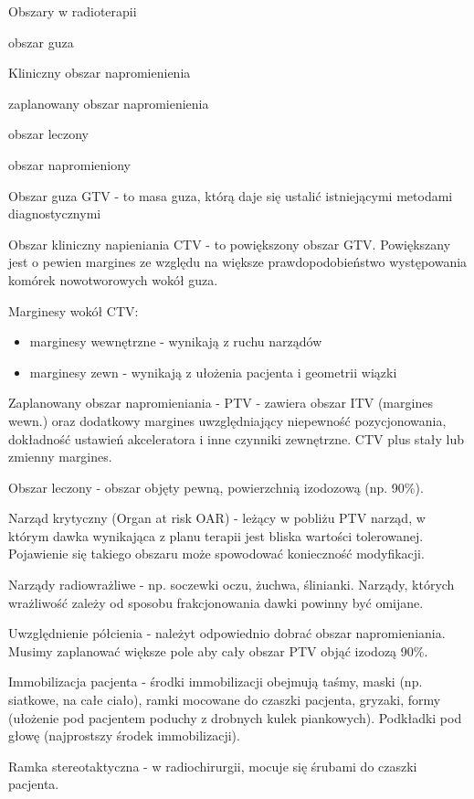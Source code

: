 \documentclass{article}
\begin{document}
Obszary w radioterapii

obszar guza

Kliniczny obszar napromienienia

zaplanowany obszar napromienienia

obszar leczony

obszar napromieniony

Obszar guza GTV - to masa guza, którą daje się ustalić istniejącymi metodami diagnostycznymi

Obszar kliniczny napieniania CTV - to powiększony obszar GTV. Powiększany jest o pewien margines ze względu na większe prawdopodobieństwo występowania komórek nowotworowych wokół guza.

Marginesy wokół CTV:

\begin{itemize}
    \item marginesy wewnętrzne - wynikają z ruchu narządów
    \item marginesy zewn - wynikają z ułożenia pacjenta i geometrii wiązki
\end{itemize}

Zaplanowany obszar napromieniania - PTV - zawiera obszar ITV (margines wewn.) oraz dodatkowy margines uwzględniający niepewność pozycjonowania, dokładność ustawień akceleratora i inne czynniki zewnętrzne. CTV plus stały lub zmienny margines.

Obszar leczony - obszar objęty pewną, powierzchnią izodozową (np. 90\%).

Narząd krytyczny (Organ at risk OAR) - leżący w pobliżu PTV narząd, w którym dawka wynikająca z planu terapii jest bliska wartości tolerowanej. Pojawienie się takiego obszaru może spowodować konieczność modyfikacji.

Narządy radiowrażliwe - np. soczewki oczu, żuchwa, ślinianki. Narządy, których wrażliwość zależy od sposobu frakcjonowania dawki powinny być omijane.

Uwzględnienie półcienia - należyt odpowiednio dobrać obszar napromieniania. Musimy zaplanować większe pole aby cały obszar PTV objąć izodozą 90\%.

Immobilizacja pacjenta - środki immobilizacji obejmują taśmy, maski (np. siatkowe, na całe ciało), ramki mocowane do czaszki pacjenta, gryzaki, formy (ułożenie pod pacjentem poduchy z drobnych kulek piankowych). Podkładki pod głowę (najprostszy środek immobilizacji).

Ramka stereotaktyczna - w radiochirurgii, mocuje się śrubami do czaszki pacjenta.
\end{document}
